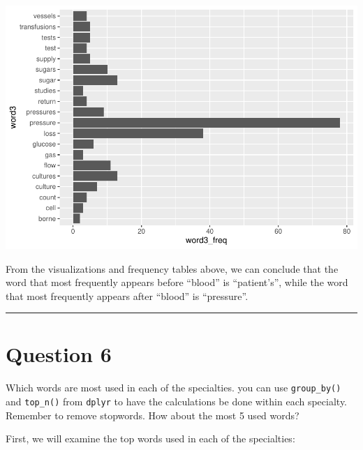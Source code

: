 \documentclass[
]{article}
\newenvironment{Shaded}{\begin{snugshade}}{\end{snugshade}}
\newcommand{\AttributeTok}[1]{\textcolor[rgb]{0.77,0.63,0.00}{#1}}
\newcommand{\ConstantTok}[1]{\textcolor[rgb]{0.00,0.00,0.00}{#1}}
\newcommand{\DecValTok}[1]{\textcolor[rgb]{0.00,0.00,0.81}{#1}}
\newcommand{\FunctionTok}[1]{\textcolor[rgb]{0.00,0.00,0.00}{#1}}
\newcommand{\NormalTok}[1]{#1}
\newcommand{\SpecialCharTok}[1]{\textcolor[rgb]{0.00,0.00,0.00}{#1}}
\newcommand{\StringTok}[1]{\textcolor[rgb]{0.31,0.60,0.02}{#1}}
\begin{document}
\includegraphics{lab08-text-mining_files/figure-latex/unnamed-chunk-18-1.pdf}

From the visualizations and frequency tables above, we can conclude that
the word that most frequently appears before ``blood'' is ``patient's'',
while the word that most frequently appears after ``blood'' is
``pressure''.

\begin{center}\rule{0.5\linewidth}{0.5pt}\end{center}

\hypertarget{question-6}{%
\section{Question 6}\label{question-6}}

Which words are most used in each of the specialties. you can use
\texttt{group\_by()} and \texttt{top\_n()} from \texttt{dplyr} to have
the calculations be done within each specialty. Remember to remove
stopwords. How about the most 5 used words?

First, we will examine the top words used in each of the specialties:

\begin{Shaded}
\end{Shaded}
\end{document}

